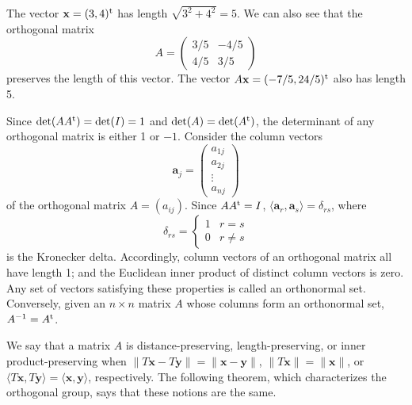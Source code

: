  
\begin{example}{}
The vector ${\mathbf x} =(3,4)^{\rm t}$ has length $\sqrt{3^2 + 4^2} = 5$.  We
can also see that the orthogonal matrix 
\[
A=
\begin{pmatrix}
3/5 & -4/5 \\
4/5 & 3/5
\end{pmatrix}
\]
preserves the length of this vector. The vector $A{\mathbf x} =
(-7/5,24/5)^{\rm t}$ also has length 5. 
\end{example}
 
 
Since $\det(A A^{\rm t}) = \det(I) = 1$ and $\det(A) = \det( A^{\rm t}
)$, the determinant of any orthogonal matrix is either 1 or $-1$.
Consider the column vectors 
\[
{\mathbf a}_j
=
\begin{pmatrix}
a_{1j} \\ a_{2j} \\ \vdots \\ a_{nj}
\end{pmatrix}
\]
of the orthogonal matrix
$A= (a_{ij})$. Since
$AA^{\rm t} = I$,
$\langle {\mathbf a}_r, {\mathbf a}_s \rangle = \delta_{rs}$,
where
\[
\delta_{rs}
=
\left\{
\begin{array}{cc}
1 & r = s \\
0 & r \neq s
\end{array}
\right.
\]
is the Kronecker delta. Accordingly, column
vectors of an orthogonal matrix all have length 1; and the Euclidean
inner product of distinct column vectors is zero. Any set of vectors
satisfying these properties is called an {\bfi orthonormal
set}. Conversely, given an $n \times n$ matrix
$A$ whose columns form an orthonormal set, $A^{-1} = A^{\rm t}$.
 
 
We say that a matrix $A$ is {\bfi
distance-preserving}, {\bfi
length-preserving}, or {\bfi inner
product-preserving\/} when $\|
T{\mathbf x}- T{\mathbf y} \| =\| {\mathbf x}- {\mathbf y} \|$, $\| T{\mathbf x}
\| =\| {\mathbf x} \|$, or $\langle  T{\mathbf x}, T{\mathbf y} \rangle =
\langle {\mathbf x},{\mathbf y} \rangle$, respectively. The following
theorem, which characterizes the orthogonal group, says that these
notions are the same.
 
